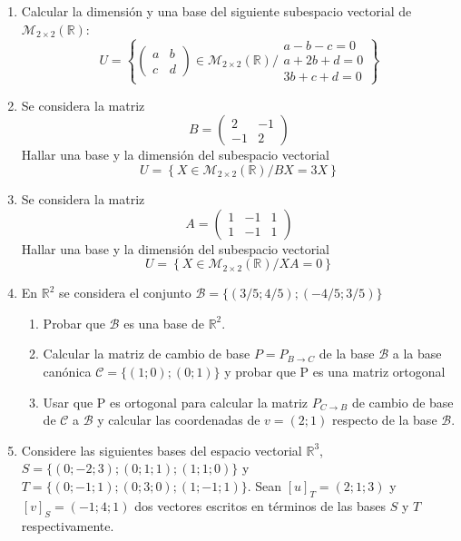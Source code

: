 \documentclass[12pt,letterpaper]{article}
\begin{document}
\begin{enumerate}
  \item Calcular la dimensión y una base del siguiente subespacio vectorial de $\mathcal{M}_{2\times2}(\mathbb{R})$:
  $$
  U=\left\{\begin{pmatrix}
  a & b\\
  c & d
  \end{pmatrix} \in \mathcal{M}_{2\times2}(\mathbb{R}) / \begin{array}{l}
    a - b - c = 0\\
    a + 2b + d = 0\\
    3b + c + d = 0
  \end{array} \right\}
  $$
  \item Se considera la matriz
  $$
  B=\begin{pmatrix}
    2 & -1\\
    -1 & 2    
  \end{pmatrix}
  $$
  Hallar una base y la dimensión del subespacio vectorial
  $$
  U = \left\{ X \in \mathcal{M}_{2\times2}(\mathbb{R}) / BX = 3X\right\}
  $$
  \item Se considera la matriz
  $$
  A=\begin{pmatrix}
    1 & -1 & 1\\
    1 & -1 & 1    
  \end{pmatrix}
  $$
  Hallar una base y la dimensión del subespacio vectorial
  $$
  U = \left\{ X \in \mathcal{M}_{2\times2}(\mathbb{R}) / XA = 0\right\}
  $$
  \item En $\mathbb{R}^2$ se considera el conjunto $\mathcal{B} = \{(3/5; 4/5); (-4/5; 3/5)\}$
  \begin{enumerate}
    \item Probar que $\mathcal{B}$ es una base de $\mathbb{R}^2$.
    \item Calcular la matriz de cambio de base $P = P_{B\to C}$ de la base $\mathcal{B}$ a la base canónica $\mathcal{C} =\{(1; 0); (0; 1)\}$ y probar que P es una matriz ortogonal
    \item Usar que P es ortogonal para calcular la matriz $P_{C\to B}$ de cambio de base de $\mathcal{C}$ a $\mathcal{B}$ y calcular las coordenadas de $v = (2; 1)$ respecto de la base $\mathcal{B}$.
  \end{enumerate}
  \item Considere las siguientes bases del espacio vectorial $\mathbb{R}^3$, $S = \{(0;-2; 3); (0; 1; 1); (1; 1; 0)\}$ y $T = \{(0;-1; 1); (0; 3; 0); (1;-1; 1)\}$. Sean $[u]_T = (2; 1; 3)$ y $[v]_S = (-1; 4; 1)$ dos vectores escritos en términos de las bases $S$ y $T$ respectivamente.

\end{enumerate}
\end{document}
